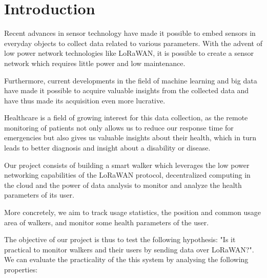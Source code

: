 \chapter{Introduction}
\label{cha:introduction}

Recent advances in sensor technology have made it possible to embed sensors in everyday objects to collect data related to various parameters. With the advent of low power network technologies like LoRaWAN, it is possible to create a sensor network which requires little power and low maintenance.

Furthermore, current developments in the field of machine learning and big data have made it possible to acquire valuable insights from the collected data and have thus made its acquisition even more lucrative.

Healthcare is a field of growing interest for this data collection, as the remote monitoring of patients not only allows us to reduce our response time for emergencies but also gives us valuable insights about their health, which in turn leads to better diagnosis and insight about a disability or disease.

Our project consists of building a smart walker which leverages the low power networking capabilities of the LoRaWAN protocol, decentralized computing in the cloud and the power of data analysis to monitor and analyze the health parameters of its user.

More concretely, we aim to track usage statistics, the position and common usage area of walkers, and monitor some health parameters of the user.

The objective of our project is thus to test the following hypothesis:
"Is it practical to monitor walkers and their users by sending data over LoRaWAN?". We can evaluate the practicality of the this system by analysing the following properties:

